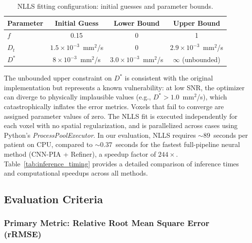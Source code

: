 \documentclass[12pt]{article}
\begin{document}
\begin{table}[h]
\centering
\caption{NLLS fitting configuration: initial guesses and parameter bounds.}
\label{tab:nlls_config}
\begin{tabular}{lccc}
\toprule
\textbf{Parameter} & \textbf{Initial Guess} & \textbf{Lower Bound} & \textbf{Upper Bound} \\
\midrule
$f$    & 0.15                           & 0                         & 1 \\
$D_t$  & $1.5 \times 10^{-3}$~mm$^2$/s  & 0                         & $2.9 \times 10^{-3}$~mm$^2$/s \\
$D^*$  & $8 \times 10^{-3}$~mm$^2$/s    & $3.0 \times 10^{-3}$~mm$^2$/s & $\infty$ (unbounded) \\
\bottomrule
\end{tabular}
\end{table}

The unbounded upper constraint on $D^*$ is consistent with the original implementation but represents a known vulnerability: at low SNR, the optimizer can diverge to physically implausible values (e.g., $D^* > 1.0$~mm$^2$/s), which catastrophically inflates the error metrics. Voxels that fail to converge are assigned parameter values of zero. The NLLS fit is executed independently for each voxel with no spatial regularization, and is parallelized across cases using Python's \textit{ProcessPoolExecutor}. In our evaluation, NLLS requires ${\sim}89$~seconds per patient on CPU, compared to ${\sim}0.37$~seconds for the fastest full-pipeline neural method (CNN-PIA + Refiner), a speedup factor of $244{\times}$. Table~\ref{tab:inference_timing} provides a detailed comparison of inference times and computational speedups across all methods.

\subsection{Evaluation Criteria}

\subsubsection{Primary Metric: Relative Root Mean Square Error (rRMSE)}
\end{document}
